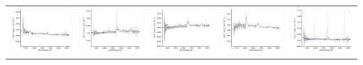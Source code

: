 \begin{center}
\begin{longtable}{l l l l l }
    \includegraphics[width=0.19\linewidth, clip]{Figs/Figs-sdss/spec-7864-56979-0753-STRIPE82-0008-034263.pdf} & \includegraphics[width=0.19\linewidth, clip]{Figs/Figs-sdss/spec-7866-57002-0979-STRIPE82-0014-010956.pdf} & \includegraphics[width=0.19\linewidth, clip]{Figs/Figs-sdss/spec-7868-57006-0207-STRIPE82-0015-016996.pdf} & \includegraphics[width=0.19\linewidth, clip]{Figs/Figs-sdss/spec-7868-57006-0691-STRIPE82-0014-014477.pdf} & \includegraphics[width=0.19\linewidth, clip]{Figs/Figs-sdss/spec-7870-57016-0292-STRIPE82-0017-021131.pdf} \\

\end{longtable}
\end{center}
